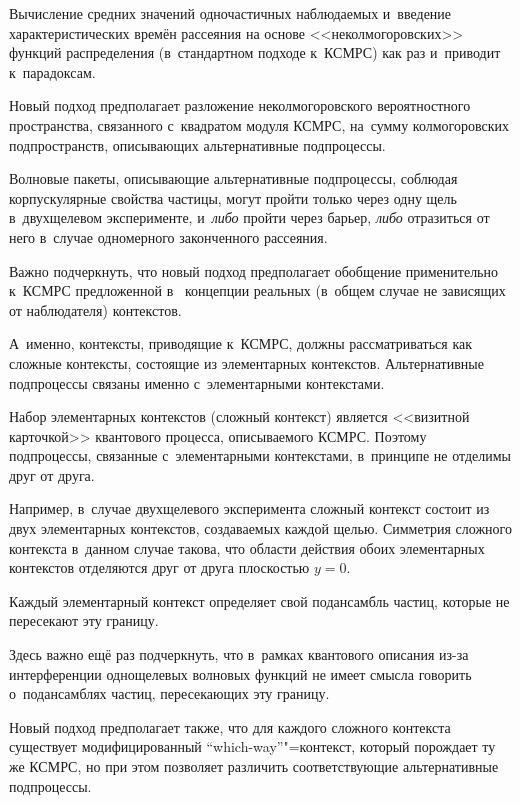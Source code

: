 Вычисление средних значений одночастичных наблюдаемых и~введение характеристических времён рассеяния на основе <<неколмогоровских>> функций распределения (в~стандартном подходе к~КСМРС) как раз и~приводит к~парадоксам.



Новый подход предполагает разложение неколмогоровского вероятностного пространства, связанного с~квадратом модуля КСМРС, на~сумму колмогоровских подпространств, описывающих альтернативные подпроцессы. 

Волновые пакеты, описывающие альтернативные подпроцессы, соблюдая корпускулярные свойства частицы, могут пройти только через одну щель в~двухщелевом эксперименте, и~{\it либо} пройти через барьер, {\it либо} отразиться от него в~случае одномерного законченного рассеяния.



Важно подчеркнуть, что новый подход предполагает обобщение применительно к~КСМРС предложенной в~\cite{chup:Hr1} концепции реальных (в~общем случае не зависящих от наблюдателя) контекстов. 

А~именно, контексты, приводящие к~КСМРС, должны рассматриваться как сложные контексты, состоящие из элементарных контекстов. Альтернативные подпроцессы связаны именно с~элементарными контекстами. 

Набор элементарных контекстов (сложный контекст) является <<визитной карточкой>> квантового процесса, описываемого КСМРС. Поэтому подпроцессы, связанные с~элементарными контекстами, в~принципе не отделимы друг от друга.



Например, в~случае двухщелевого эксперимента сложный контекст состоит из двух элементарных контекстов, создаваемых каждой щелью. Симметрия сложного контекста в~данном случае такова, что области действия обоих элементарных контекстов отделяются друг от друга плоскостью $y=0$. 

Каждый элементарный контекст определяет свой подансамбль частиц, которые не пересекают эту границу. 

Здесь важно ещё раз подчеркнуть, что в~рамках квантового описания из-за интерференции однощелевых волновых функций не имеет смысла говорить о~подансамблях частиц, пересекающих эту границу.



Новый подход предполагает также, что для каждого сложного контекста существует модифицированный ``which-way''"=контекст, который порождает ту же КСМРС, но при этом позволяет различить соответствующие альтернативные подпроцессы. 

